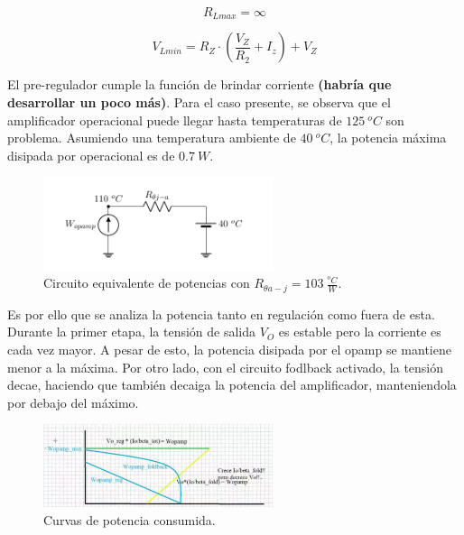 \begin{equation}
	R_{Lmax} = \infty
\end{equation}

\begin{equation}
	V_{Lmin} = R_Z \cdot \left( \frac{V_Z}{R_2} + I_z \right) + V_Z
\end{equation}

El pre-regulador cumple la función de brindar corriente \textbf{(habría que desarrollar un poco más)}. Para el caso presente, se observa que el amplificador operacional puede llegar hasta temperaturas de $125 \ ^o C$ son problema. Asumiendo una temperatura ambiente de $40 \ ^o C$, la potencia máxima disipada por operacional es de $0.7 \ W$.
\begin{figure}[H]
\centering
	\includegraphics[width=0.6\textwidth, page=1]{ImagenesEjercicio2/Potencia - Opamp.pdf}
	\caption{Circuito equivalente de potencias con $R_{\theta a-j} = 103 \ \frac{^o C}{W}$.}
	\label{fig:circuitopot}
\end{figure}

Es por ello que se analiza la potencia tanto en regulación como fuera de esta. Durante la primer etapa, la tensión de salida $V_O$ es estable pero la corriente es cada vez mayor. A pesar de esto, la potencia disipada por el opamp se mantiene menor a la máxima. Por otro lado, con el circuito fodlback activado, la tensión decae, haciendo que también decaiga la potencia del amplificador, manteniendola por debajo del máximo.
\begin{figure}[H]
\centering
	\includegraphics[width=0.6\textwidth]{ImagenesEjercicio2/Potencia2.png}
	\caption{Curvas de potencia consumida.}
	\label{fig:curvapot}
\end{figure}



